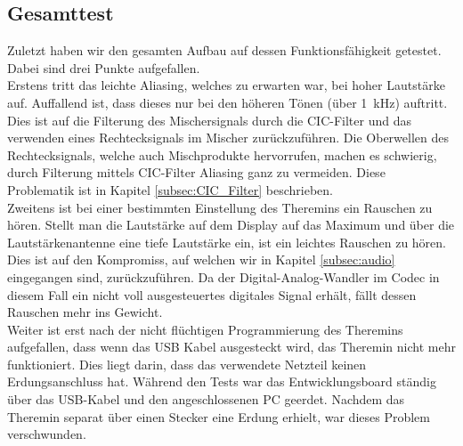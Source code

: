 \subsection{Gesamttest}\label{subsec:Gesammttest}
Zuletzt haben wir den gesamten Aufbau auf dessen Funktionsfähigkeit getestet. Dabei sind drei Punkte aufgefallen.\\
Erstens tritt das leichte Aliasing, welches zu erwarten war, bei hoher Lautstärke auf. Auffallend ist, dass dieses nur bei den höheren Tönen (über \SI{1}{kHz}) auftritt. Dies ist auf die Filterung des Mischersignals durch die CIC-Filter und das verwenden eines Rechtecksignals im Mischer zurückzuführen. Die Oberwellen des Rechtecksignals, welche auch Mischprodukte hervorrufen, machen es schwierig, durch Filterung mittels CIC-Filter Aliasing ganz zu vermeiden. Diese Problematik ist in Kapitel \ref{subsec:CIC_Filter} beschrieben.\\
Zweitens ist bei einer bestimmten Einstellung des Theremins ein Rauschen zu hören. Stellt man die Lautstärke auf dem Display auf das Maximum und über die Lautstärkenantenne eine tiefe Lautstärke ein, ist ein leichtes Rauschen zu hören. Dies ist auf den Kompromiss, auf welchen wir in Kapitel \ref{subsec:audio} eingegangen sind, zurückzuführen. Da der Digital-Analog-Wandler im Codec in diesem Fall ein nicht voll ausgesteuertes digitales Signal erhält, fällt dessen Rauschen mehr ins Gewicht.\\
Weiter ist erst nach der nicht flüchtigen Programmierung des Theremins aufgefallen, dass wenn das USB Kabel ausgesteckt wird, das Theremin nicht mehr funktioniert. Dies liegt darin, dass das verwendete Netzteil keinen Erdungsanschluss hat. Während den Tests war das Entwicklungsboard ständig über das USB-Kabel und den angeschlossenen PC geerdet. Nachdem das Theremin separat über einen Stecker eine Erdung erhielt, war dieses Problem verschwunden.


